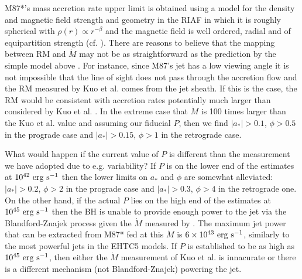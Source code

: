 \documentclass[twocolumn]{aastex62} %
\begin{document}
M87*'s mass accretion rate upper limit is obtained using a model for the density and magnetic field strength and geometry in the RIAF in which it is roughly spherical with $\rho(r) \propto r^{-\beta}$ and the magnetic field is well ordered, radial and of equipartition strength (cf. \citealt{Marrone2006,Kuo2014}). There are reasons to believe that the mapping between RM and $\dot{M}$ may not be as straightforward as the prediction by the simple model above . For instance, since M87's jet has a low viewing angle  it is not impossible that the line of sight does not pass through the accretion flow and the RM measured by Kuo et al. comes from the jet sheath. If this is the case, the RM would be consistent with accretion rates potentially much larger than considered by Kuo et al. \citep{Moscibrodzka2017a}. In the extreme case that $\dot{M}$ is 100 times larger than the Kuo et al. value and assuming our fiducial $P$, then we find $|a_*| > 0.1$, $\phi > 0.5$ in the prograde case and  $|a_*| > 0.15$, $\phi > 1$ in the retrograde case. 


What would happen if the current value of $P$ is different than the measurement we have adopted due to e.g. variability? If $P$ is on the lower end of the estimates at $10^{42} \ {\rm erg \ s}^{-1}$  then the lower limits on $a_*$ and $\phi$ are somewhat alleviated: $|a_*| > 0.2$, $\phi > 2$ in the prograde case and $|a_*| > 0.3$, $\phi > 4$ in the retrograde one. On the other hand, if the actual $P$ lies on the high end of the estimates at $10^{45} \ {\rm erg \ s}^{-1}$  then the BH is unable to provide enough power to the jet via the Blandford-Znajek process given the $\dot{M}$ measured by \cite{Kuo2014}. The maximum jet power that can be extracted from M87* fed at this $\dot{M}$ is $6 \times 10^{43} \ {\rm erg \ s}^{-1}$, similarly to the most powerful jets in the EHTC5 models. If $P$ is established to be as high as $10^{45} \ {\rm erg \ s}^{-1}$, then either the $\dot{M}$ measurement of Kuo et al. is innacurate or there is a different mechanism (not Blandford-Znajek) powering the jet.
\end{document}
